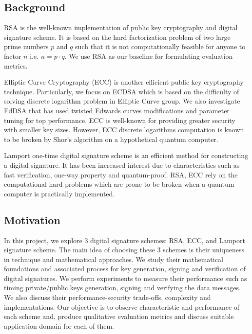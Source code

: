 \documentclass[10pt,sigconf]{acmart}
\begin{document}
\subsection{Background}

RSA \cite{Rivest:1978:MOD:359340.359342} is the well-known implementation of public key cryptography and digital signature scheme. It is based on the hard factorization problem of two large prime numbers $p$ and $q$ such that it is not computationally feasible for anyone to factor $n$ i.e. $n = p \cdot q$. We use RSA as our baseline for formulating evaluation metrics.

Elliptic Curve Cryptography (ECC) is another efficient public key cryptography technique. Particularly, we focus on ECDSA \cite{Kerry13fipspub} which is based on the difficulty of solving discrete logarithm problem in Elliptic Curve group. %
We also investigate EdDSA \cite{Bernstein2012} that has used twisted Edwards curves modifications and parameter tuning for top performance. ECC is well-known for providing greater security with smaller key sizes. %
However, ECC discrete logarithms computation is known to be broken by Shor's algorithm \cite{Shor:1997:PAP:264393.264406} on a hypothetical quantum computer.

Lamport one-time digital signature scheme \cite{lamport} is an efficient method for constructing a digital signature. %
It has been increased interest due to characteristics such as fast verification, one-way property and quantum-proof. RSA, ECC rely on the computational hard problems which are prone to be broken when a quantum computer is practically implemented.

\subsection{Motivation}

In this project, we explore 3 digital signature schemes: RSA, ECC, and Lamport signature scheme. The main idea of choosing these 3 schemes is their uniqueness in technique and mathematical approaches. We study their mathematical foundations and associated process for key generation, signing and verification of digital signatures. We perform experiments to measure their performance such as timing private/public keys generation, signing and verifying the data messages. We also discuss their performance-security trade-offs, complexity and implementations. Our objective is to observe characteristic and performance of each scheme and, produce qualitative evaluation metrics and discuss suitable application domain for each of them.
\end{document}
